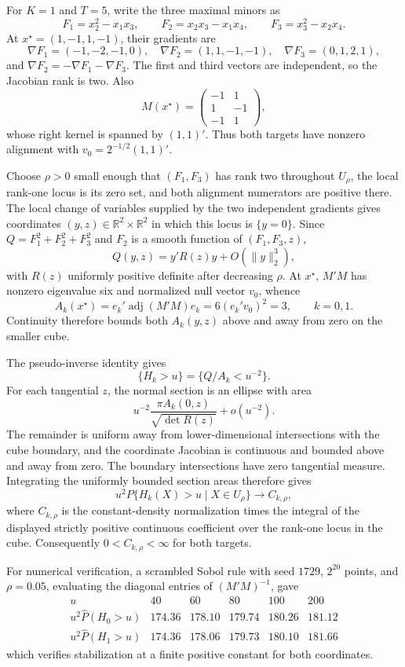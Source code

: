 For \(K=1\) and \(T=5\), write the three maximal minors as
\[
F_1=x_2^2-x_1x_3,\qquad
F_2=x_2x_3-x_1x_4,\qquad
F_3=x_3^2-x_2x_4.
\]
At \(x^\star=(1,-1,1,-1)\), their gradients are
\[
\nabla F_1=(-1,-2,-1,0),\quad
\nabla F_2=(1,1,-1,-1),\quad
\nabla F_3=(0,1,2,1),
\]
and \(\nabla F_2=-\nabla F_1-\nabla F_3\). The first and third vectors are independent, so the Jacobian rank is two. Also
\[
M(x^\star)=
\begin{pmatrix}-1&1\\1&-1\\-1&1\end{pmatrix},
\]
whose right kernel is spanned by \((1,1)'\). Thus both targets have nonzero alignment with \(v_0=2^{-1/2}(1,1)'\).

Choose \(\rho>0\) small enough that \((F_1,F_3)\) has rank two throughout \(U_\rho\), the local rank-one locus is its zero set, and both alignment numerators are positive there. The local change of variables supplied by the two independent gradients gives coordinates \((y,z)\in\mathbb R^2\times\mathbb R^2\) in which this locus is \(\{y=0\}\). Since \(Q=F_1^2+F_2^2+F_3^2\) and \(F_2\) is a smooth function of \((F_1,F_3,z)\),
\[
Q(y,z)=y'R(z)y+O(\|y\|_2^3),
\]
with \(R(z)\) uniformly positive definite after decreasing \(\rho\). At \(x^\star\), \(M'M\) has nonzero eigenvalue six and normalized null vector \(v_0\), whence
\[
A_k(x^\star)=e_k'\operatorname{adj}(M'M)e_k
=6(e_k'v_0)^2=3,
\qquad k=0,1.
\]
Continuity therefore bounds both \(A_k(y,z)\) above and away from zero on the smaller cube.

The pseudo-inverse identity gives
\[
\{H_k>u\}=\{Q/A_k<u^{-2}\}.
\]
For each tangential \(z\), the normal section is an ellipse with area
\[
u^{-2}\frac{\pi A_k(0,z)}{\sqrt{\det R(z)}}+o(u^{-2}).
\]
The remainder is uniform away from lower-dimensional intersections with the cube boundary, and the coordinate Jacobian is continuous and bounded above and away from zero. The boundary intersections have zero tangential measure. Integrating the uniformly bounded section areas therefore gives
\[
u^2P\{H_k(X)>u\mid X\in U_\rho\}
\longrightarrow C_{k,\rho},
\]
where \(C_{k,\rho}\) is the constant-density normalization times the integral of the displayed strictly positive continuous coefficient over the rank-one locus in the cube. Consequently \(0<C_{k,\rho}<\infty\) for both targets.

For numerical verification, a scrambled Sobol rule with seed \(1729\), \(2^{20}\) points, and \(\rho=0.05\), evaluating the diagonal entries of \((M'M)^{-1}\), gave
\[
\begin{array}{c|rrrrr}
u&40&60&80&100&200\\ \hline
u^2\widehat P(H_0>u)&174.36&178.10&179.74&180.26&181.12\\
u^2\widehat P(H_1>u)&174.36&178.06&179.73&180.10&181.66
\end{array}
\]
which verifies stabilization at a finite positive constant for both coordinates.

